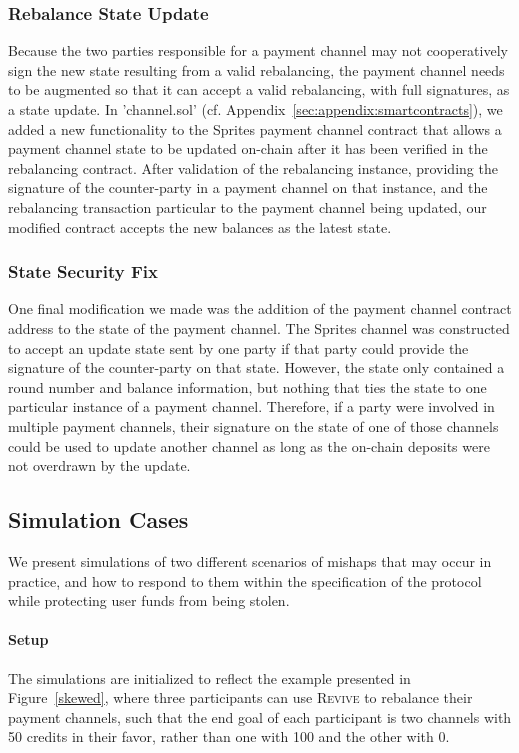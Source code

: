 \documentclass[sigconf]{acmart}
\newcommand{\name}{\textsc{Revive}\xspace}
\begin{document}
\subsubsection{Rebalance State Update}
Because the two parties responsible for a payment channel may not cooperatively sign the new state resulting from a valid rebalancing, the payment channel needs to be augmented so that it can accept a valid rebalancing, with full signatures, as a state update.
In 'channel.sol' (cf. Appendix~\ref{sec:appendix:smartcontracts}), we added a new functionality to the Sprites payment channel contract that allows a payment channel state to be updated on-chain after it has been verified in the rebalancing contract. After validation of the rebalancing instance, providing the signature of the counter-party in a payment channel on that instance, and the rebalancing transaction particular to the payment channel being updated, our modified contract accepts the new balances as the latest state.

\subsubsection{State Security Fix}
One final modification we made was the addition of the payment channel contract address to the state of the payment channel. The Sprites channel was constructed to accept an update state sent by one party if that party could provide the signature of the counter-party on that state. However, the state only contained a round number and balance information, but nothing that ties the state to one particular instance of a payment channel. Therefore, if a party were involved in multiple payment channels, their signature on the state of one of those channels could be used to update another channel as long as the on-chain deposits were not overdrawn by the update.

\subsection{Simulation Cases}
We present simulations of two different scenarios of mishaps that may occur in practice, and how to respond to them within the specification of the protocol while protecting user funds from being stolen.

\paragraph{Setup}
The simulations are initialized to reflect the example presented in Figure~\ref{skewed}, where three participants can use \name to rebalance their payment channels, such that the end goal of each participant is two channels with 50 credits in their favor, rather than one with 100 and the other with 0.
\end{document}
